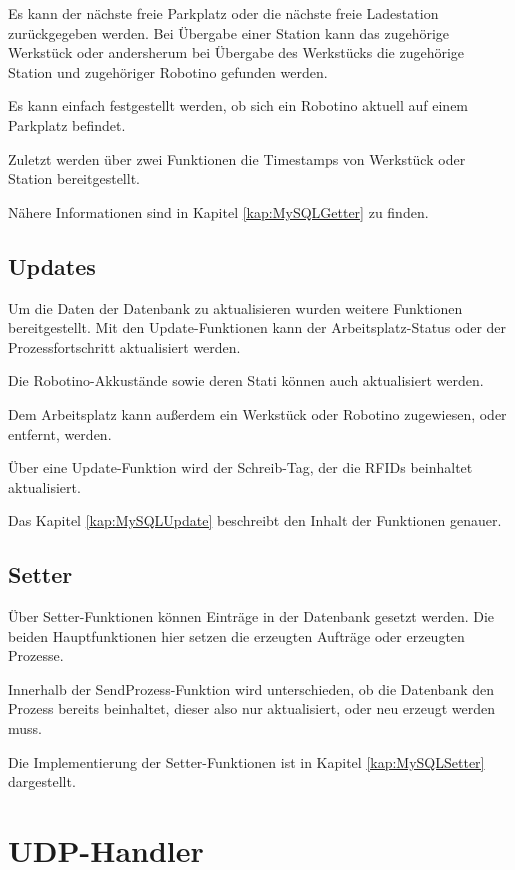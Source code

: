 Es kann der nächste freie Parkplatz oder die nächste freie Ladestation zurückgegeben werden. Bei Übergabe einer Station kann das zugehörige Werkstück oder andersherum bei Übergabe des Werkstücks die zugehörige Station und zugehöriger Robotino gefunden werden. 

Es kann einfach festgestellt werden, ob sich ein Robotino aktuell auf einem Parkplatz befindet.

Zuletzt werden über zwei Funktionen die Timestamps von Werkstück oder Station bereitgestellt.

Nähere Informationen sind in Kapitel \ref{kap:MySQLGetter} zu finden.

\subsection{Updates}

Um die Daten der Datenbank zu aktualisieren wurden weitere Funktionen bereitgestellt. Mit den Update-Funktionen kann der Arbeitsplatz-Status oder der Prozessfortschritt aktualisiert werden. 

Die Robotino-Akkustände sowie deren Stati können auch aktualisiert werden.

Dem Arbeitsplatz kann außerdem ein Werkstück oder Robotino zugewiesen, oder entfernt, werden. 

Über eine Update-Funktion wird der Schreib-Tag, der die RFIDs beinhaltet aktualisiert. 

Das Kapitel \ref{kap:MySQLUpdate} beschreibt den Inhalt der Funktionen genauer.

\subsection{Setter}

Über Setter-Funktionen können Einträge in der Datenbank gesetzt werden. Die beiden Hauptfunktionen hier setzen die erzeugten Aufträge oder erzeugten Prozesse.

Innerhalb der SendProzess-Funktion wird unterschieden, ob die Datenbank den Prozess bereits beinhaltet, dieser also nur aktualisiert, oder neu erzeugt werden muss. 

Die Implementierung der Setter-Funktionen ist in Kapitel \ref{kap:MySQLSetter} dargestellt.

\section{UDP-Handler} 
\label{sec:UdpHandler}

